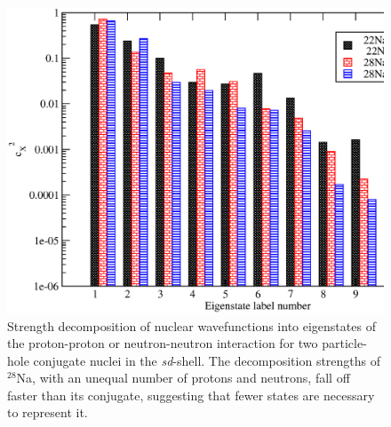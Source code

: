 \begin{figure}
    \centering
    \includegraphics[width=4.5in]{Figures/decomp_na_ln}
    \caption{Strength decomposition of nuclear wavefunctions into eigenstates of
    the proton-proton or neutron-neutron interaction for two particle-hole conjugate
    nuclei in the \textit{sd}-shell. The decomposition strengths of $^{28}$Na, with an unequal number of protons
    and neutrons, fall off faster than its conjugate, suggesting that fewer states
    are necessary to represent it. } 
    \label{fig: pndecomp2}
\end{figure}
